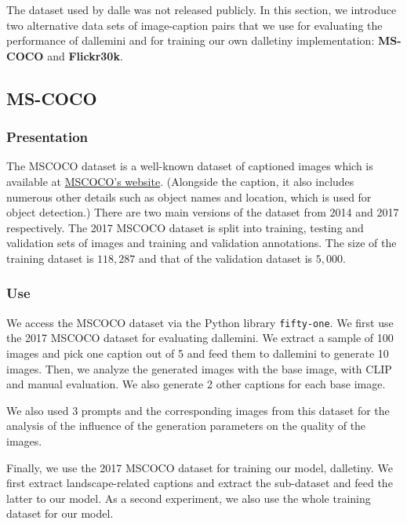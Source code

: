 \documentclass{article}
\begin{document}
\begin{multicols}{2}
The dataset used by \gls{dalle} was not released publicly. In this section, we introduce two alternative data sets of image-caption pairs that we use for evaluating the performance of \gls{dallemini} and for training our own \gls{dalletiny} implementation: \textbf{MS-COCO} and \textbf{Flickr30k}.

\subsection{MS-COCO}

\subsubsection{Presentation}

The MSCOCO dataset is a well-known dataset of captioned images which is available at \href{https://cocodataset.org/}{MSCOCO's website}. (Alongside the caption, it also includes numerous other details such as object names and location, which is used for object detection.) There are two main versions of the dataset from 2014 and 2017 respectively. The 2017 MSCOCO dataset is split into training, testing and validation sets of images and training and validation annotations. The size of the training dataset is $118,287$ and that of the validation dataset is $5,000$.

\subsubsection{Use}

We access the MSCOCO dataset via the Python library \texttt{fifty-one}. 
We first use the 2017 MSCOCO dataset for evaluating \gls{dallemini}.
We extract a sample of 100 images and pick one caption out of 5 and feed them to \gls{dallemini} to generate 10 images.
Then, we analyze the generated images with the base image, with CLIP and manual evaluation.
We also generate 2 other captions for each base image.

We also used 3 prompts and the corresponding images from this dataset for the analysis of the influence of the generation parameters on the quality of the images.

Finally, we use the 2017 MSCOCO dataset for training our model, \gls{dalletiny}. We first extract landscape-related captions and extract the sub-dataset and feed the latter to our model.
As a second experiment, we also use the whole training dataset for our model.


\end{multicols}
\end{document}
